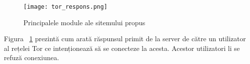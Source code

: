 \begin{figure}[h]
	\centering
	\texttt{[image: tor\_respons.png]}
	\caption{Principalele module ale sitemului propus}
	\label{fig:tor_respons}
\end{figure}
Figura ~\ref{fig:tor_respons}  prezintă cum arată răspunsul primit de la server de către un utilizator al rețelei Tor ce intenționează să se conecteze la acesta. Acestor utilizatori li se refuză conexiunea.  \\


%
%
%
%
%
%  
%    
%    
